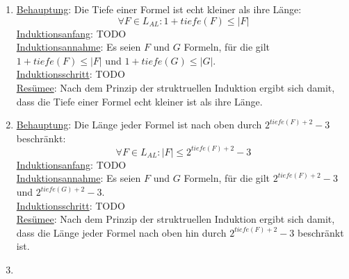 \documentclass[a4paper]{scrartcl}
\title{\titleinfo}
\author{Arne Feil}
\date{\today}
\newcommand{\aufgabe}[1]{\item[\textbf{#1}]}
\begin{document}
\begin{enumerate}

\aufgabe{5.2}
\underline{Behauptung}: Die Tiefe einer Formel ist echt kleiner als ihre Länge:
\[\forall F \in L_{AL} : 1+tiefe(F) \le |F| \]
\underline{Induktionsanfang}: TODO\\
\underline{Induktionsannahme}: Es seien \(F\) und \(G\) Formeln, für die gilt \(1+tiefe(F) \le |F| \) und \(1+tiefe(G) \le |G| \).\\
\underline{Induktionsschritt}: TODO\\
\underline{Resümee}: Nach dem Prinzip der struktruellen Induktion ergibt sich
damit, dass die Tiefe einer Formel echt kleiner ist als ihre Länge.


\aufgabe{5.3}
\underline{Behauptung}: Die Länge jeder Formel ist nach oben durch \(2^{tiefe(F)+2}-3\) beschränkt:
\[\forall F \in L_{AL} : |F| \le 2^{tiefe(F)+2}-3\]
\underline{Induktionsanfang}: TODO\\
\underline{Induktionsannahme}: Es seien \(F\) und \(G\) Formeln, für die gilt \(2^{tiefe(F)+2}-3\) und \(2^{tiefe(G)+2}-3\).\\
\underline{Induktionsschritt}: TODO\\
\underline{Resümee}: Nach dem Prinzip der struktruellen Induktion ergibt sich
damit, dass die Länge jeder Formel nach oben hin durch \(2^{tiefe(F)+2}-3\) beschränkt ist.


\aufgabe{5.4}


\end{enumerate}
\end{document}
